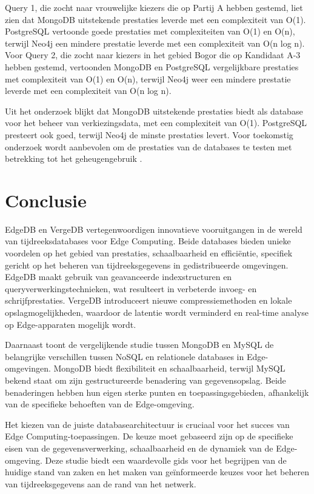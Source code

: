 Query 1, die zocht naar vrouwelijke kiezers die op Partij A hebben gestemd, liet zien dat MongoDB uitstekende prestaties leverde met een complexiteit van O(1). PostgreSQL vertoonde goede prestaties met complexiteiten van O(1) en O(n), terwijl Neo4j een mindere prestatie leverde met een complexiteit van O(n log n). Voor Query 2, die zocht naar kiezers in het gebied Bogor die op Kandidaat A-3 hebben gestemd, vertoonden MongoDB en PostgreSQL vergelijkbare prestaties met complexiteit van O(1) en O(n), terwijl Neo4j weer een mindere prestatie leverde met een complexiteit van O(n log n).

Uit het onderzoek blijkt dat MongoDB uitstekende prestaties biedt als database voor het beheer van verkiezingsdata, met een complexiteit van O(1). PostgreSQL presteert ook goed, terwijl Neo4j de minste prestaties levert. Voor toekomstig onderzoek wordt aanbevolen om de prestaties van de databases te testen met betrekking tot het geheugengebruik \autocite{Gyorodi2015comparative}.


\section{Conclusie}
EdgeDB en VergeDB vertegenwoordigen innovatieve vooruitgangen in de wereld van tijdreeksdatabases voor Edge Computing. Beide databases bieden unieke voordelen op het gebied van prestaties, schaalbaarheid en efficiëntie, specifiek gericht op het beheren van tijdreeksgegevens in gedistribueerde omgevingen. EdgeDB maakt gebruik van geavanceerde indexstructuren en queryverwerkingstechnieken, wat resulteert in verbeterde invoeg- en schrijfprestaties. VergeDB introduceert nieuwe compressiemethoden en lokale opslagmogelijkheden, waardoor de latentie wordt verminderd en real-time analyse op Edge-apparaten mogelijk wordt.

Daarnaast toont de vergelijkende studie tussen MongoDB en MySQL de belangrijke verschillen tussen NoSQL en relationele databases in Edge-omgevingen. MongoDB biedt flexibiliteit en schaalbaarheid, terwijl MySQL bekend staat om zijn gestructureerde benadering van gegevensopslag. Beide benaderingen hebben hun eigen sterke punten en toepassingsgebieden, afhankelijk van de specifieke behoeften van de Edge-omgeving.

Het kiezen van de juiste databasearchitectuur is cruciaal voor het succes van Edge Computing-toepassingen. De keuze moet gebaseerd zijn op de specifieke eisen van de gegevensverwerking, schaalbaarheid en de dynamiek van de Edge-omgeving. Deze studie biedt een waardevolle gids voor het begrijpen van de huidige stand van zaken en het maken van geïnformeerde keuzes voor het beheren van tijdreeksgegevens aan de rand van het netwerk.